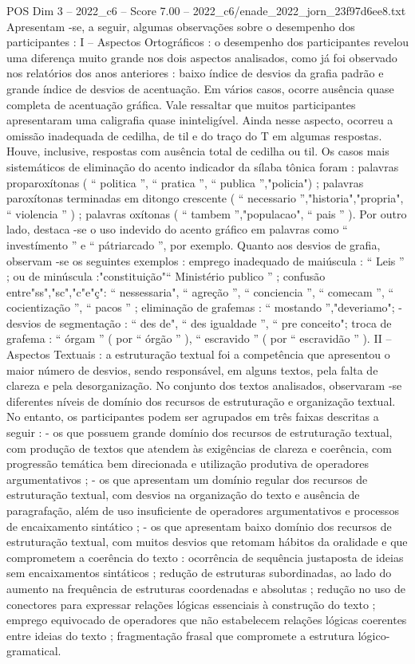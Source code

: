 \begin{textsample}{POS Dim 3 – 2022\_c6 – Score 7.00 – 2022\_c6/enade\_2022\_jorn\_23f97d6ee8.txt}
Apresentam -se, a seguir, algumas observações sobre o desempenho dos participantes : I – Aspectos Ortográficos : o desempenho dos participantes revelou uma diferença muito grande nos dois aspectos analisados, como já foi observado nos relatórios dos anos anteriores : baixo índice de desvios da grafia padrão e grande índice de desvios de acentuação.
Em vários casos, ocorre ausência quase completa de acentuação gráfica.
Vale ressaltar que muitos participantes apresentaram uma caligrafia quase ininteligível.
Ainda nesse aspecto, ocorreu a omissão inadequada de cedilha, de til e do traço do T em algumas respostas.
Houve, inclusive, respostas com ausência total de cedilha ou til.
Os casos mais sistemáticos de eliminação do acento indicador da sílaba tônica foram : palavras proparoxítonas ( “ politica ”, “ pratica ”, “ publica ”,"policia") ; palavras paroxítonas terminadas em ditongo crescente ( “ necessario ”,"historia","propria", “ violencia ” ) ; palavras oxítonas ( “ tambem ”,"populacao", “ pais ” ).
Por outro lado, destaca -se o uso indevido do acento gráfico em palavras como “ investímento ” e “ pátriarcado ”, por exemplo.
Quanto aos desvios de grafia, observam -se os seguintes exemplos : emprego inadequado de maiúscula : “ Leis ” ; ou de minúscula :"constituição"“ Ministério publico ” ; confusão entre"ss","sc","c"e"ç": “ nessessaria", “ agreção ”, “ conciencia ”, “ comecam ”, “ cocientização ”, “ pacos ” ; eliminação de grafemas : “ mostando ”,"deveriamo"; - desvios de segmentação : “ des de", “ des igualdade ”, “ pre conceito"; troca de grafema : “ órgam ” ( por “ órgão ” ), “ escravido ” ( por “ escravidão ” ).
II – Aspectos Textuais : a estruturação textual foi a competência que apresentou o maior número de desvios, sendo responsável, em alguns textos, pela falta de clareza e pela desorganização.
No conjunto dos textos analisados, observaram -se diferentes níveis de domínio dos recursos de estruturação e organização textual.
No entanto, os participantes podem ser agrupados em três faixas descritas a seguir : - os que possuem grande domínio dos recursos de estruturação textual, com produção de textos que atendem às exigências de clareza e coerência, com progressão temática bem direcionada e utilização produtiva de operadores argumentativos ; - os que apresentam um domínio regular dos recursos de estruturação textual, com desvios na organização do texto e ausência de paragrafação, além de uso insuficiente de operadores argumentativos e processos de encaixamento sintático ; - os que apresentam baixo domínio dos recursos de estruturação textual, com muitos desvios que retomam hábitos da oralidade e que comprometem a coerência do texto : ocorrência de sequência justaposta de ideias sem encaixamentos sintáticos ; redução de estruturas subordinadas, ao lado do aumento na frequência de estruturas coordenadas e absolutas ; redução no uso de conectores para expressar relações lógicas essenciais à construção do texto ; emprego equivocado de operadores que não estabelecem relações lógicas coerentes entre ideias do texto ; fragmentação frasal que compromete a estrutura lógico-gramatical.

\end{textsample}
